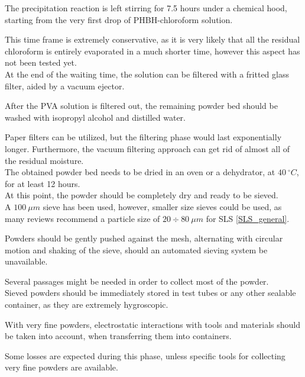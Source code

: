 \documentclass{article}
\begin{document}
        The precipitation reaction is left stirring for 7.5 hours under a 
        chemical hood, starting from the very first drop of PHBH-chloroform solution. 

        This time frame is extremely conservative, as it is very likely that all the residual chloroform is entirely 
        evaporated in a much shorter time, however this aspect has not been tested yet. \\

        At the end of the waiting time, the solution can be filtered with a fritted glass filter, aided by a vacuum 
        ejector. 

        After the PVA solution is filtered out, the remaining powder bed should be washed with isopropyl alcohol and 
        distilled water. 

        Paper filters can be utilized, but the filtering phase would last exponentially longer. Furthermore, the vacuum filtering 
        approach can get rid of almost all of the residual moisture. \\ 

        The obtained powder bed needs to be dried in an oven or a dehydrator, at $40 \ ^{\circ}C$, for at least 12 hours. \\ 

        At this point, the powder should be completely dry and ready to be sieved. \\ 

        A $100 \ \mu m$ sieve has been used, however, smaller size sieves could be used, as many reviews recommend a particle 
        size of $20 \div 80 \ \mu m$ for SLS \ref{SLS_general}. 
        
        Powders should be gently pushed against the mesh, alternating with circular motion and shaking of the sieve, should 
        an automated sieving system be unavailable. 

        Several passages might be needed in order to collect most of the powder. \\ 

        Sieved powders should be immediately stored in test tubes or any other sealable container, as they are extremely hygroscopic. 

        With very fine powders, electrostatic interactions with tools and materials should be taken into account, when transferring 
        them into containers. 

        Some losses are expected during this phase, unless specific tools for collecting very fine powders are available. 
\end{document}
